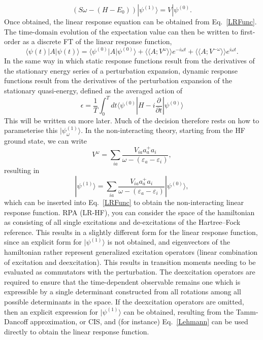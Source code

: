 \documentclass[a4paper,oneside,11pt]{article}
\numberwithin{equation}{section}
\begin{document}
\begin{equation}
(S \omega - (H - E_0))|\psi^{(1)}\rangle = V|\psi^{(0)}.     \label{LinearSystem}
\end{equation}
Once obtained, the linear response equation can be obtained from Eq.~\ref{LRFunc}.
The time-domain evolution of the expectation value can then be written to first-order as a discrete FT of the linear response function,
\begin{equation}
\langle \psi(t) | A | \psi(t) \rangle = \langle \psi^{(0)} | A | \psi^{(0)} \rangle + \langle \langle A ; V^{\omega} \rangle \rangle e^{-i \omega t} + \langle \langle A ; V^{-\omega} \rangle \rangle e^{i \omega t} .
\end{equation}
In the same way in which static response functions result from the derivatives of the stationary energy series of a perturbation expansion, dynamic response functions result from the 
derivatives of the perturbation expansion of the stationary quasi-energy, defined as the averaged action of
\begin{equation}
\epsilon = \frac{1}{T}\int_0^T dt \langle \psi^{(0)} | H-i\frac{\partial}{\partial t} | \psi^{(0)} \rangle
\end{equation}
This will be written on more later.
Much of the decision therefore rests on how to parameterise this $|\psi^{(1)}_{\omega} \rangle$. In the non-interacting theory, starting from the HF ground state, we can write
\begin{equation}
V^{\omega} = \sum_{ia} \frac{V_{ia} a_a^{+} a_i}{\omega - (\varepsilon_a - \varepsilon_i)}, \label{NonInteractingOperator}
\end{equation}
resulting in
\begin{equation}
|\psi^{(1)} \rangle = \sum_{ia} \frac{V_{ia} a_a^{+} a_i}{\omega - (\varepsilon_a - \varepsilon_i)} |\psi^{(0)} \rangle,    \label{NonInteractingPhi1}
\end{equation}
which can be inserted into Eq.~\ref{LRFunc} to obtain the non-interacting linear response function.
RPA (LR-HF), you can consider the space of the hamiltonian as consisting of all single excitations and de-excitations of the Hartree--Fock reference. This results in a slightly different
form for the linear response function, since an explicit form for $|\psi^{(1)} \rangle$ is not obtained, and eigenvectors of the hamiltonian rather represent generalized excitation operators 
(linear combination of excitation and deexcitation).
This results in transition moments needing to be evaluated as commutators with the perturbation. The deexcitation operators are required to ensure that the time-dependent observable remains
one which is expressible by a single determinant constructed from all rotations among all possible determinants in the space. If the deexcitation operators are omitted, then an explicit 
expression for $|\psi^{(1)} \rangle$
can be obtained, resulting from the Tamm-Dancoff approximation, or CIS, and (for instance) Eq.~\ref{Lehmann} can be used directly to obtain the linear response function.
\end{document}
